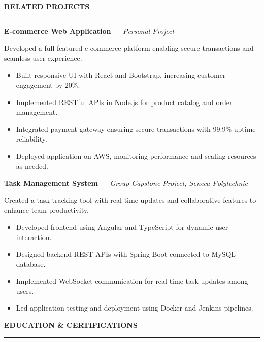 \documentclass[10pt,letterpaper]{article}
\begin{document}
\vspace{6pt}

\textbf{RELATED PROJECTS}\\[-8pt]
\noindent\rule{\textwidth}{1pt}

\vspace{-2pt}

\textbf{E-commerce Web Application} --- \textit{Personal Project}

\vspace{1pt}

Developed a full-featured e-commerce platform enabling secure transactions and seamless user experience.

\begin{itemize}
\item Built responsive UI with React and Bootstrap, increasing customer engagement by 20\%.
\item Implemented RESTful APIs in Node.js for product catalog and order management.
\item Integrated payment gateway ensuring secure transactions with 99.9\% uptime reliability.
\item Deployed application on AWS, monitoring performance and scaling resources as needed.
\end{itemize}

\textbf{Task Management System} --- \textit{Group Capstone Project, Seneca Polytechnic}

\vspace{1pt}

Created a task tracking tool with real-time updates and collaborative features to enhance team productivity.

\begin{itemize}
\item Developed frontend using Angular and TypeScript for dynamic user interaction.
\item Designed backend REST APIs with Spring Boot connected to MySQL database.
\item Implemented WebSocket communication for real-time task updates among users.
\item Led application testing and deployment using Docker and Jenkins pipelines.
\end{itemize}

\vspace{6pt}

\textbf{EDUCATION \& CERTIFICATIONS}\\[-8pt]
\noindent\rule{\textwidth}{1pt}
\end{document}
